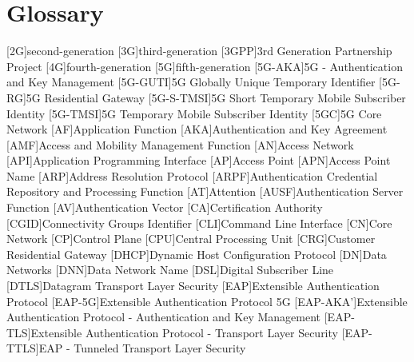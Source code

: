 \chapter{Glossary}

\footnotesize
\SingleSpacing

\begin{multicols}{2}
    \begin{acronym}[WPA]
        [2G]{second-generation}
        [3G]{third-generation}
        [3GPP]{3rd Generation Partnership Project}
        [4G]{fourth-generation}
        [5G]{fifth-generation}
        [5G-AKA]{5G - Authentication and Key Management}
        [5G-GUTI]{5G Globally Unique Temporary Identifier}
        [5G-RG]{5G Residential Gateway}
        [5G-S-TMSI]{5G Short Temporary Mobile Subscriber Identity}
        [5G-TMSI]{5G Temporary Mobile Subscriber Identity}
        [5GC]{5G Core Network}
        [AF]{Application Function}
        [AKA]{Authentication and Key Agreement}
        [AMF]{Access and Mobility Management Function}
        [AN]{Access Network}
        [API]{Application Programming Interface}
        [AP]{Access Point}
        [APN]{Access Point Name}
        [ARP]{Address Resolution Protocol}
        [ARPF]{Authentication Credential Repository and Processing Function}
        [AT]{Attention}
        [AUSF]{Authentication Server Function}
        [AV]{Authentication Vector}
        [CA]{Certification Authority}
        [CGID]{Connectivity Groups Identifier}
        [CLI]{Command Line Interface}
        [CN]{Core Network}
        [CP]{Control Plane}
        [CPU]{Central Processing Unit}
        [CRG]{Customer Residential Gateway}
        [DHCP]{Dynamic Host Configuration Protocol}
        [DN]{Data Networks}
        [DNN]{Data Network Name}
        [DSL]{Digital Subscriber Line}
        [DTLS]{Datagram Transport Layer Security}
        [EAP]{Extensible Authentication Protocol}
        [EAP-5G]{Extensible Authentication Protocol 5G}
        [EAP-AKA']{Extensible Authentication Protocol - Authentication and Key Management}
        [EAP-TLS]{Extensible Authentication Protocol - Transport Layer Security}
        [EAP-TTLS]{EAP - Tunneled Transport Layer Security}

\end{acronym}
\end{multicols}
